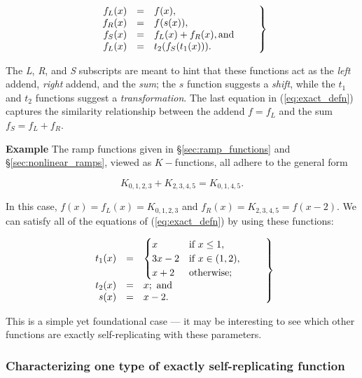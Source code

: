 \documentclass[20pt,]{extarticle}
\begin{document}
\begin{equation}\left.\mbox{$\begin{array}{rcl}
  f_L(x) & = & f(x), \\
  f_R(x) & = & f(s(x)), \\
  f_S(x) & = & f_L(x) + f_R(x), \text{and} \\
  f_L(x) & = & t_2(f_S(t_1(x))).
\end{array}$}\quad\quad\right\rbrace\label{eq:exact_defn}\end{equation}

The \emph{L}, \emph{R}, and \emph{S} subscripts are meant to hint that
these functions act as the \emph{left} addend, \emph{right} addend, and
the \emph{sum}; the \(s\) function suggests a \emph{shift}, while the
\(t_1\) and \(t_2\) functions suggest a \emph{transformation}. The last
equation in (\ref{eq:exact_defn}) captures the similarity relationship
between the addend \(f = f_L\) and the sum \(f_S = f_L + f_R\).

\textbf{Example} The ramp functions given in §\ref{sec:ramp_functions}
and §\ref{sec:nonlinear_ramps}, viewed as \(K-\)functions, all adhere to
the general form

\[K_{0,1,2,3} + K_{2,3,4,5} = K_{0,1,4,5}.\]

In this case, \(f(x) = f_L(x) = K_{0,1,2,3}\) and
\(f_R(x) = K_{2,3,4,5} = f(x-2)\). We can satisfy all of the equations
of (\ref{eq:exact_defn}) by using these functions:

\begin{equation}\left.\mbox{$\begin{array}{rcl}
t_1(x) & = &
\begin{cases}
  x              &   \text{if } x \le 1,       \\
  3x - 2         &   \text{if } x \in (1,2),   \\
  x + 2          &   \text{otherwise;}         \\
\end{cases}\\
t_2(x) & = & x; \text{ and} \\
s(x)   & = & x - 2. \\
\end{array}$}\quad\quad\right\rbrace\label{eq:s_t1_t2}\end{equation}

This is a simple yet foundational case --- it may be interesting to see
which other functions are exactly self-replicating with these
parameters.

\subsubsection{Characterizing one type of exactly self-replicating
function}\label{characterizing-one-type-of-exactly-self-replicating-function}
\end{document}
